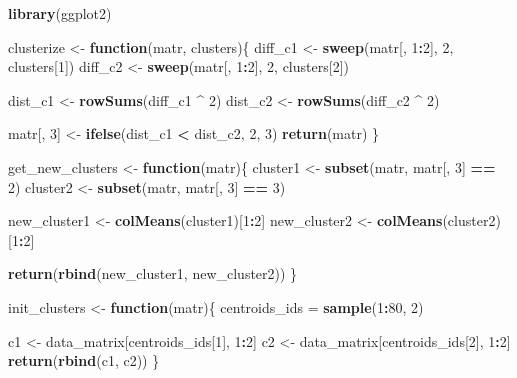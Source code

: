 \documentclass[
]{article}
\newenvironment{Shaded}{\begin{snugshade}}{\end{snugshade}}
\newcommand{\ControlFlowTok}[1]{\textcolor[rgb]{0.13,0.29,0.53}{\textbf{#1}}}
\newcommand{\DecValTok}[1]{\textcolor[rgb]{0.00,0.00,0.81}{#1}}
\newcommand{\KeywordTok}[1]{\textcolor[rgb]{0.13,0.29,0.53}{\textbf{#1}}}
\newcommand{\NormalTok}[1]{#1}
\newcommand{\OperatorTok}[1]{\textcolor[rgb]{0.81,0.36,0.00}{\textbf{#1}}}
\newcommand{\StringTok}[1]{\textcolor[rgb]{0.31,0.60,0.02}{#1}}
\begin{document}
\begin{Shaded}
\begin{Highlighting}[]
\KeywordTok{library}\NormalTok{(ggplot2)}

\NormalTok{clusterize <-}\StringTok{ }\ControlFlowTok{function}\NormalTok{(matr, clusters)\{}
\NormalTok{  diff_c1 <-}\StringTok{ }\KeywordTok{sweep}\NormalTok{(matr[, }\DecValTok{1}\OperatorTok{:}\DecValTok{2}\NormalTok{], }\DecValTok{2}\NormalTok{, clusters[}\DecValTok{1}\NormalTok{]) }
\NormalTok{  diff_c2 <-}\StringTok{ }\KeywordTok{sweep}\NormalTok{(matr[, }\DecValTok{1}\OperatorTok{:}\DecValTok{2}\NormalTok{], }\DecValTok{2}\NormalTok{, clusters[}\DecValTok{2}\NormalTok{]) }
  
\NormalTok{  dist_c1 <-}\StringTok{ }\KeywordTok{rowSums}\NormalTok{(diff_c1 }\OperatorTok{^}\StringTok{ }\DecValTok{2}\NormalTok{)}
\NormalTok{  dist_c2 <-}\StringTok{ }\KeywordTok{rowSums}\NormalTok{(diff_c2 }\OperatorTok{^}\StringTok{ }\DecValTok{2}\NormalTok{)}
  
\NormalTok{  matr[, }\DecValTok{3}\NormalTok{] <-}\StringTok{ }\KeywordTok{ifelse}\NormalTok{(dist_c1 }\OperatorTok{<}\StringTok{ }\NormalTok{dist_c2, }\DecValTok{2}\NormalTok{, }\DecValTok{3}\NormalTok{)}
  \KeywordTok{return}\NormalTok{(matr)}
\NormalTok{\}}

\NormalTok{get_new_clusters <-}\StringTok{ }\ControlFlowTok{function}\NormalTok{(matr)\{}
\NormalTok{  cluster1 <-}\StringTok{ }\KeywordTok{subset}\NormalTok{(matr, matr[, }\DecValTok{3}\NormalTok{] }\OperatorTok{==}\StringTok{ }\DecValTok{2}\NormalTok{)}
\NormalTok{  cluster2 <-}\StringTok{ }\KeywordTok{subset}\NormalTok{(matr, matr[, }\DecValTok{3}\NormalTok{] }\OperatorTok{==}\StringTok{ }\DecValTok{3}\NormalTok{)}
  
\NormalTok{  new_cluster1 <-}\StringTok{ }\KeywordTok{colMeans}\NormalTok{(cluster1)[}\DecValTok{1}\OperatorTok{:}\DecValTok{2}\NormalTok{]}
\NormalTok{  new_cluster2 <-}\StringTok{ }\KeywordTok{colMeans}\NormalTok{(cluster2)[}\DecValTok{1}\OperatorTok{:}\DecValTok{2}\NormalTok{]}
  
  \KeywordTok{return}\NormalTok{(}\KeywordTok{rbind}\NormalTok{(new_cluster1, new_cluster2))}
\NormalTok{\}}

\NormalTok{init_clusters <-}\StringTok{ }\ControlFlowTok{function}\NormalTok{(matr)\{}
\NormalTok{  centroids_ids =}\StringTok{ }\KeywordTok{sample}\NormalTok{(}\DecValTok{1}\OperatorTok{:}\DecValTok{80}\NormalTok{, }\DecValTok{2}\NormalTok{)}
  
\NormalTok{  c1 <-}\StringTok{ }\NormalTok{data_matrix[centroids_ids[}\DecValTok{1}\NormalTok{], }\DecValTok{1}\OperatorTok{:}\DecValTok{2}\NormalTok{]}
\NormalTok{  c2 <-}\StringTok{ }\NormalTok{data_matrix[centroids_ids[}\DecValTok{2}\NormalTok{], }\DecValTok{1}\OperatorTok{:}\DecValTok{2}\NormalTok{]}
  \KeywordTok{return}\NormalTok{(}\KeywordTok{rbind}\NormalTok{(c1, c2))}
\NormalTok{\}}
\end{Highlighting}
\end{Shaded}
\end{document}
